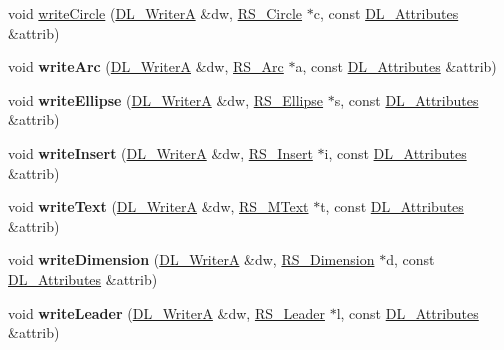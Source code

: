 \begin{DoxyCompactItemize}
\item 
void \hyperlink{classRS__FilterJWW_a0b0c16651796f5051edcf30b9adf8149}{write\-Circle} (\hyperlink{classDL__WriterA}{D\-L\-\_\-\-Writer\-A} \&dw, \hyperlink{classRS__Circle}{R\-S\-\_\-\-Circle} $\ast$c, const \hyperlink{classDL__Attributes}{D\-L\-\_\-\-Attributes} \&attrib)
\item 
\hypertarget{classRS__FilterJWW_a96d75cfc585e11ff8ef25fc6eec01235}{void {\bfseries write\-Arc} (\hyperlink{classDL__WriterA}{D\-L\-\_\-\-Writer\-A} \&dw, \hyperlink{classRS__Arc}{R\-S\-\_\-\-Arc} $\ast$a, const \hyperlink{classDL__Attributes}{D\-L\-\_\-\-Attributes} \&attrib)}\label{classRS__FilterJWW_a96d75cfc585e11ff8ef25fc6eec01235}

\item 
\hypertarget{classRS__FilterJWW_a2d43951ad00dadd6522e7c7042905dc1}{void {\bfseries write\-Ellipse} (\hyperlink{classDL__WriterA}{D\-L\-\_\-\-Writer\-A} \&dw, \hyperlink{classRS__Ellipse}{R\-S\-\_\-\-Ellipse} $\ast$s, const \hyperlink{classDL__Attributes}{D\-L\-\_\-\-Attributes} \&attrib)}\label{classRS__FilterJWW_a2d43951ad00dadd6522e7c7042905dc1}

\item 
\hypertarget{classRS__FilterJWW_a6b6d48f155d34da033ab31bd2f3c27e4}{void {\bfseries write\-Insert} (\hyperlink{classDL__WriterA}{D\-L\-\_\-\-Writer\-A} \&dw, \hyperlink{classRS__Insert}{R\-S\-\_\-\-Insert} $\ast$i, const \hyperlink{classDL__Attributes}{D\-L\-\_\-\-Attributes} \&attrib)}\label{classRS__FilterJWW_a6b6d48f155d34da033ab31bd2f3c27e4}

\item 
\hypertarget{classRS__FilterJWW_a83ce6820b1a4b44957f3aa2b2f747994}{void {\bfseries write\-Text} (\hyperlink{classDL__WriterA}{D\-L\-\_\-\-Writer\-A} \&dw, \hyperlink{classRS__MText}{R\-S\-\_\-\-M\-Text} $\ast$t, const \hyperlink{classDL__Attributes}{D\-L\-\_\-\-Attributes} \&attrib)}\label{classRS__FilterJWW_a83ce6820b1a4b44957f3aa2b2f747994}

\item 
\hypertarget{classRS__FilterJWW_ade4d171e04a27a8a91fff654a4f12ae7}{void {\bfseries write\-Dimension} (\hyperlink{classDL__WriterA}{D\-L\-\_\-\-Writer\-A} \&dw, \hyperlink{classRS__Dimension}{R\-S\-\_\-\-Dimension} $\ast$d, const \hyperlink{classDL__Attributes}{D\-L\-\_\-\-Attributes} \&attrib)}\label{classRS__FilterJWW_ade4d171e04a27a8a91fff654a4f12ae7}

\item 
\hypertarget{classRS__FilterJWW_afc4f5d356119339c493a55ffcd61304e}{void {\bfseries write\-Leader} (\hyperlink{classDL__WriterA}{D\-L\-\_\-\-Writer\-A} \&dw, \hyperlink{classRS__Leader}{R\-S\-\_\-\-Leader} $\ast$l, const \hyperlink{classDL__Attributes}{D\-L\-\_\-\-Attributes} \&attrib)}\label{classRS__FilterJWW_afc4f5d356119339c493a55ffcd61304e}


\end{DoxyCompactItemize}
